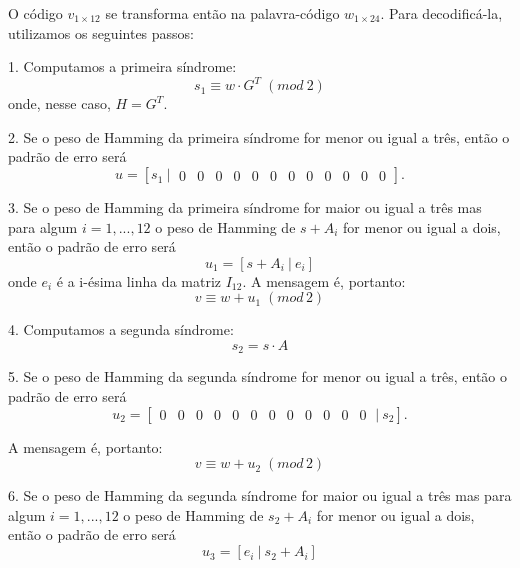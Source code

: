 \documentclass[%
aip,
jmp,%
amsmath,amssymb,
reprint,%
]{revtex4-1}
\begin{document}
	O código $v_{1\times12}$ se transforma então na palavra-código $w_{1\times24}$. Para decodificá-la, utilizamos os seguintes passos:
	
	1. Computamos a primeira síndrome:
	\begin{equation}
		s_{1} \equiv w\cdot G^{T}\;(mod\:2)
	\end{equation}
	onde, nesse caso, $H=G^{T}$.
	
	2. Se o peso de Hamming da primeira síndrome for  menor ou igual a três, então o padrão de erro será
	\begin{equation}
		u = \left[s_{1}\:|\:\begin{array}{cccccccccccc}
	0&0&0&0&0&0&0&0&0&0&0&0
	\end{array}\right].
	\end{equation}
	
	3. Se o peso de Hamming da primeira síndrome for maior ou igual a três mas para algum $i=1,...,12$ o peso de Hamming de $s+A_{i}$ for menor ou igual a dois, então o padrão de erro será
	\begin{equation}
		u_1=\left[s+A_{i}\:|\:e_{i}\right]
	\end{equation}
	onde $e_i$ é a i-ésima linha da matriz $I_{12}$. A mensagem é, portanto:
	\begin{equation}
	v \equiv w+u_1\; (mod\, 2)
	\end{equation}
	
	4. Computamos a segunda síndrome:
	\begin{equation}
		s_2 = s\cdot A
	\end{equation}
	
	5. Se o peso de Hamming da segunda síndrome for menor ou igual a três, então o padrão de erro será
	\begin{equation}
		u_2 = \left[\begin{array}{cccccccccccc}
		0&0&0&0&0&0&0&0&0&0&0&0
		\end{array}\:|\:s_{2}\right].
	\end{equation}
	
	A mensagem é, portanto:
	\begin{equation}
	v \equiv w+u_2\; (mod\, 2)
	\end{equation}
	
	6. Se o peso de Hamming da segunda síndrome for maior ou igual a três mas para algum $i=1,...,12$ o peso de Hamming de $s_{2}+A_{i}$ for menor ou igual a dois, então o padrão de erro será
	\begin{equation}
	u_3=\left[e_{i}\:|\:s_{2}+A_{i}\right]
	\end{equation}
	
\end{document}
